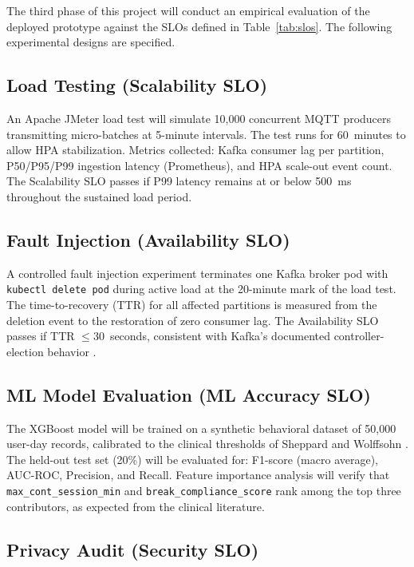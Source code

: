 \documentclass[conference]{IEEEtran}
\begin{document}
The third phase of this project will conduct an empirical evaluation of the deployed
prototype against the SLOs defined in Table~\ref{tab:slos}. The following experimental
designs are specified.

\subsection{Load Testing (Scalability SLO)}

An Apache JMeter load test will simulate 10,000 concurrent MQTT producers transmitting
micro-batches at 5-minute intervals. The test runs for 60~minutes to allow HPA
stabilization. Metrics collected: Kafka consumer lag per partition, P50/P95/P99 ingestion
latency (Prometheus), and HPA scale-out event count. The Scalability SLO passes if P99
latency remains at or below 500~ms throughout the sustained load period.

\subsection{Fault Injection (Availability SLO)}

A controlled fault injection experiment terminates one Kafka broker pod with
\texttt{kubectl delete pod} during active load at the 20-minute mark of the load test.
The time-to-recovery (TTR) for all affected partitions is measured from the deletion
event to the restoration of zero consumer lag. The Availability SLO passes if TTR
$\leq 30$~seconds, consistent with Kafka's documented controller-election behavior
\cite{b10}.

\subsection{ML Model Evaluation (ML Accuracy SLO)}

The XGBoost model will be trained on a synthetic behavioral dataset of 50,000
user-day records, calibrated to the clinical thresholds of Sheppard and Wolffsohn
\cite{b2}. The held-out test set (20\%) will be evaluated for: F1-score (macro average),
AUC-ROC, Precision, and Recall. Feature importance analysis will verify that
\texttt{max\_cont\_session\_min} and \texttt{break\_compliance\_score} rank among the
top three contributors, as expected from the clinical literature.

\subsection{Privacy Audit (Security SLO)}
\end{document}

